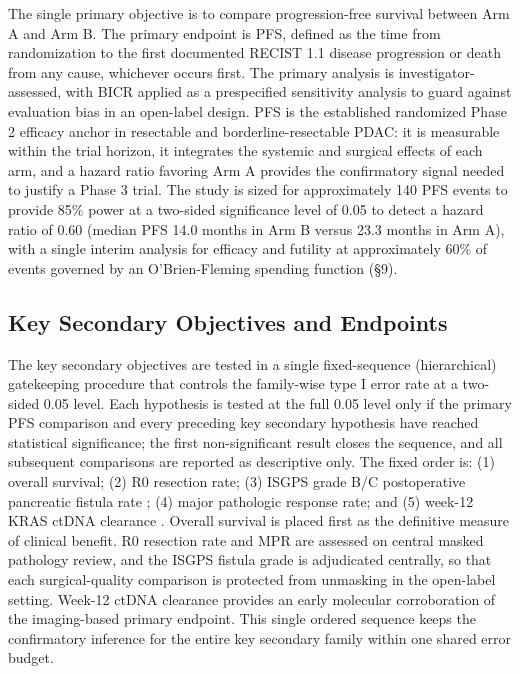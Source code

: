 The single primary objective is to compare progression-free survival between Arm A
and Arm B. The primary endpoint is PFS, defined as the time from randomization to
the first documented RECIST 1.1 disease progression or death from any cause,
whichever occurs first. The primary analysis is investigator-assessed, with BICR
applied as a prespecified sensitivity analysis to guard against evaluation bias in
an open-label design. PFS is the established randomized Phase 2 efficacy anchor in
resectable and borderline-resectable PDAC: it is measurable within the trial
horizon, it integrates the systemic and surgical effects of each arm, and a hazard
ratio favoring Arm A provides the confirmatory signal needed to justify a Phase 3
trial. The study is sized for approximately 140 PFS events to provide 85\% power
at a two-sided significance level of 0.05 to detect a hazard ratio of 0.60
(median PFS 14.0 months in Arm B versus 23.3 months in Arm A), with a single
interim analysis for efficacy and futility at approximately 60\% of events
governed by an O'Brien-Fleming spending function \cite{DeMets1994lan,Jennison2000group}
(\S9).

\subsection{Key Secondary Objectives and Endpoints}

The key secondary objectives are tested in a single fixed-sequence (hierarchical)
gatekeeping procedure that controls the family-wise type I error rate at a
two-sided 0.05 level. Each hypothesis is tested at the full 0.05 level only if the
primary PFS comparison and every preceding key secondary hypothesis have reached
statistical significance; the first non-significant result closes the sequence, and
all subsequent comparisons are reported as descriptive only. The fixed order is:
(1) overall survival; (2) R0 resection rate; (3) ISGPS grade B/C postoperative
pancreatic fistula rate \cite{Bassi2017}; (4) major pathologic response rate; and
(5) week-12 KRAS ctDNA clearance \cite{Tie2019ctdna}. Overall survival is placed
first as the definitive measure of clinical benefit. R0 resection rate and MPR are
assessed on central masked pathology review, and the ISGPS fistula grade is
adjudicated centrally, so that each surgical-quality comparison is protected from
unmasking in the open-label setting. Week-12 ctDNA clearance provides an early
molecular corroboration of the imaging-based primary endpoint. This single ordered
sequence keeps the confirmatory inference for the entire key secondary family
within one shared error budget.

